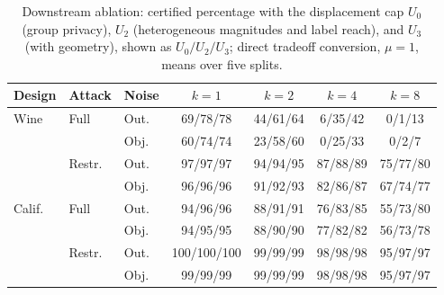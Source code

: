 \begin{table}[t]
\centering
\caption{Downstream ablation: certified percentage with the displacement cap $U_0$ (group privacy), $U_2$ (heterogeneous magnitudes and label reach), and $U_3$ (with geometry), shown as $U_0/U_2/U_3$; direct tradeoff conversion, $\mu=1$, means over five splits.}
\label{tab:downstream-u2}
\footnotesize
\setlength{\tabcolsep}{2.5pt}
\begin{tabular}{lllcccc}
\toprule
Design & Attack & Noise & $k=1$ & $k=2$ & $k=4$ & $k=8$ \\
\midrule
Wine & Full & Out. & 69/78/78 & 44/61/64 & 6/35/42 & 0/1/13 \\
 &  & Obj. & 60/74/74 & 23/58/60 & 0/25/33 & 0/2/7 \\
 & Restr. & Out. & 97/97/97 & 94/94/95 & 87/88/89 & 75/77/80 \\
 &  & Obj. & 96/96/96 & 91/92/93 & 82/86/87 & 67/74/77 \\
\midrule
Calif. & Full & Out. & 94/96/96 & 88/91/91 & 76/83/85 & 55/73/80 \\
 &  & Obj. & 94/95/95 & 88/90/90 & 77/82/82 & 56/73/78 \\
 & Restr. & Out. & 100/100/100 & 99/99/99 & 98/98/98 & 95/97/97 \\
 &  & Obj. & 99/99/99 & 99/99/99 & 98/98/98 & 95/97/97 \\
\bottomrule
\end{tabular}
\end{table}
